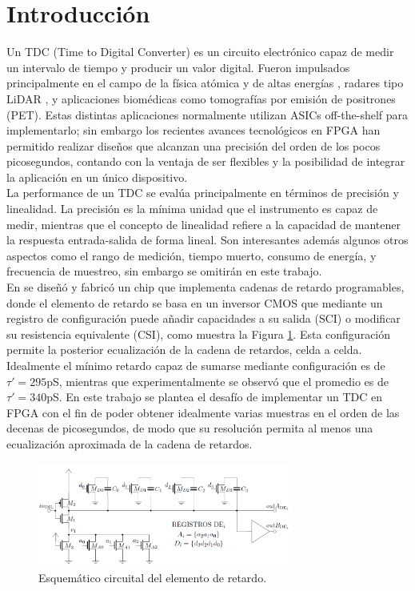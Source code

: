 \clearpage

\section{Introducción}
Un TDC (Time to Digital Converter) es un circuito electrónico capaz de medir un intervalo de tiempo y producir un valor digital. 
Fueron impulsados principalmente en el campo de la física atómica y de altas energías \cite{Altruda2023}, radares tipo LiDAR \cite{Maatta1998}, 
y aplicaciones biomédicas como tomografías por emisión de positrones (PET). Estas distintas aplicaciones normalmente utilizan  ASICs off-the-shelf para
implementarlo; sin embargo los recientes avances tecnológicos en FPGA han permitido realizar diseños
que alcanzan una precisión del orden de los pocos picosegundos, contando con la ventaja de ser flexibles y la posibilidad de integrar la aplicación
en un único dispositivo. \\

La performance de un TDC se evalúa principalmente en términos de precisión y linealidad. La precisión
es la mínima unidad que el instrumento es capaz de medir, mientras que el concepto de linealidad refiere
a la capacidad de mantener la respuesta entrada-salida de forma lineal. Son interesantes además algunos
otros aspectos como el rango de medición, tiempo muerto, consumo de energía, y frecuencia de muestreo,
sin embargo se omitirán en este trabajo.\\

En \cite{Nacho} se diseñó y fabricó 
un chip que implementa cadenas de retardo programables, donde el elemento de retardo se basa
en un inversor CMOS que mediante un registro de configuración puede añadir capacidades a su 
salida (SCI) o modificar su resistencia equivalente (CSI), como muestra la Figura \ref{fig: nacho_delay}.
Esta configuración permite la posterior ecualización de la cadena de retardos, celda a celda.
Idealmente el mínimo retardo capaz de sumarse mediante configuración es de $\tau ' = 295$pS, mientras
que experimentalmente se observó que el promedio es de $\tau ' = 340$pS. 
En este trabajo se plantea el desafío de implementar un TDC en FPGA con el fin de poder obtener 
idealmente varias muestras en el orden de las decenas de picosegundos, de modo que su resolución
permita al menos una ecualización aproximada de la cadena de retardos.

\begin{figure}[H]
      \centering
      \includegraphics[width=0.75\textwidth]{imagenes/nacho_delay.png}
      \caption{Esquemático circuital del elemento de retardo.}
      \label{fig: nacho_delay}
\end{figure}

